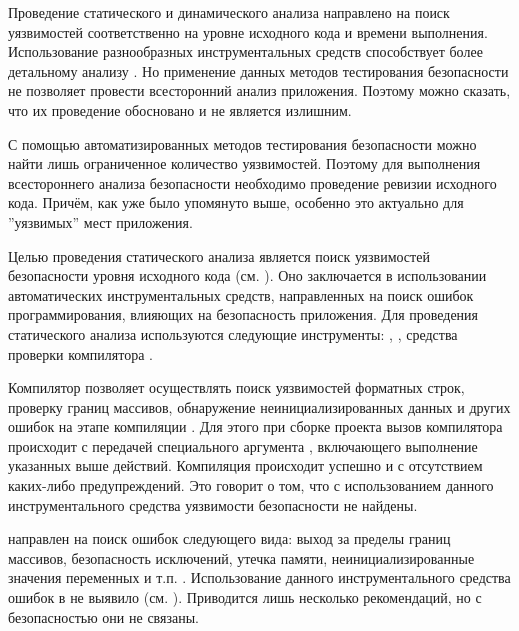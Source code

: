 %
Проведение статического и динамического анализа направлено на поиск уязвимостей соответственно на уровне исходного кода и времени выполнения. 
%
Использование разнообразных инструментальных средств способствует более детальному анализу . 
%
Но применение данных методов тестирования безопасности не позволяет провести всесторонний анализ приложения. 
%
Поэтому можно сказать, что их проведение обосновано и не является излишним.

%
С помощью автоматизированных методов тестирования безопасности можно найти лишь ограниченное количество уязвимостей. 
%
Поэтому для выполнения всестороннего анализа безопасности  необходимо проведение ревизии исходного кода. 
%
Причём, как уже было упомянуто выше, особенно это актуально для ''уязвимых'' мест приложения. 



%
Целью проведения статического анализа является поиск уязвимостей безопасности уровня исходного кода (см. ). 
%
Оно заключается в использовании автоматических инструментальных средств, направленных на поиск ошибок программирования, влияющих на безопасность приложения. 
%
Для проведения статического анализа  используются следующие инструменты: , , средства проверки компилятора . 

%
Компилятор  позволяет осуществлять поиск уязвимостей форматных строк, проверку границ массивов, обнаружение неинициализированных данных и других ошибок на этапе компиляции . 
%
Для этого при сборке проекта вызов компилятора происходит с передачей специального аргумента , включающего выполнение указанных выше действий. 
%
Компиляция  происходит успешно и с отсутствием каких-либо предупреждений. 
%
Это говорит о том, что с использованием данного инструментального средства уязвимости безопасности не найдены. 

%
 направлен на поиск ошибок следующего вида: выход за пределы границ массивов, безопасность исключений, утечка памяти, неинициализированные значения переменных и т.п. . 
%
Использование данного инструментального средства ошибок в  не выявило (см. ). 
%
Приводится лишь несколько рекомендаций, но с безопасностью они не связаны. 

